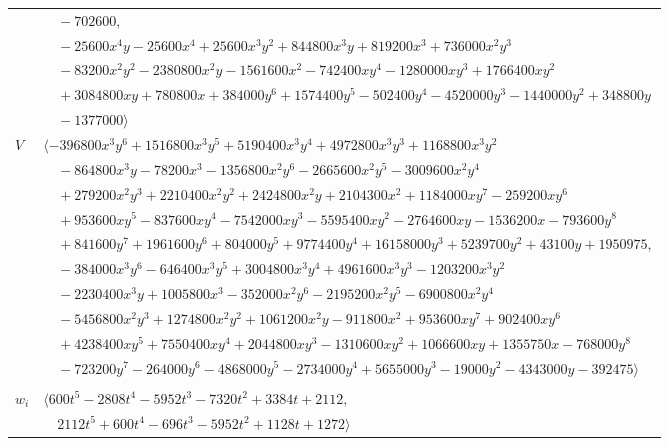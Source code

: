 \documentclass[11pt]{article}
\begin{document}
\begin{longtable}{@{}ll@{}}
 & $\quad -702600,$\\
 & $\quad -25600x^{4}y-25600x^{4}+25600x^{3}y^{2}+844800x^{3}y+819200x^{3}+736000x^{2}y^{3}$\\
 & $\quad -83200x^{2}y^{2}-2380800x^{2}y-1561600x^{2}-742400xy^{4}-1280000xy^{3}+1766400xy^{2}$\\
 & $\quad +3084800xy+780800x+384000y^{6}+1574400y^{5}-502400y^{4}-4520000y^{3}-1440000y^{2}+348800y$\\
 & $\quad -1377000\rangle$\\
$V$ & $\langle -396800x^{3}y^{6}+1516800x^{3}y^{5}+5190400x^{3}y^{4}+4972800x^{3}y^{3}+1168800x^{3}y^{2}$\\
 & $\quad -864800x^{3}y-78200x^{3}-1356800x^{2}y^{6}-2665600x^{2}y^{5}-3009600x^{2}y^{4}$\\
 & $\quad +279200x^{2}y^{3}+2210400x^{2}y^{2}+2424800x^{2}y+2104300x^{2}+1184000xy^{7}-259200xy^{6}$\\
 & $\quad +953600xy^{5}-837600xy^{4}-7542000xy^{3}-5595400xy^{2}-2764600xy-1536200x-793600y^{8}$\\
 & $\quad +841600y^{7}+1961600y^{6}+804000y^{5}+9774400y^{4}+16158000y^{3}+5239700y^{2}+43100y+1950975,$\\
 & $\quad -384000x^{3}y^{6}-646400x^{3}y^{5}+3004800x^{3}y^{4}+4961600x^{3}y^{3}-1203200x^{3}y^{2}$\\
 & $\quad -2230400x^{3}y+1005800x^{3}-352000x^{2}y^{6}-2195200x^{2}y^{5}-6900800x^{2}y^{4}$\\
 & $\quad -5456800x^{2}y^{3}+1274800x^{2}y^{2}+1061200x^{2}y-911800x^{2}+953600xy^{7}+902400xy^{6}$\\
 & $\quad +4238400xy^{5}+7550400xy^{4}+2044800xy^{3}-1310600xy^{2}+1066600xy+1355750x-768000y^{8}$\\
 & $\quad -723200y^{7}-264000y^{6}-4868000y^{5}-2734000y^{4}+5655000y^{3}-19000y^{2}-4343000y-392475\rangle$\\
\addlinespace[2pt]
\multicolumn{2}{@{}p{0.97\textwidth}@{}}{$i=71$, $D_i=8$, $\rho_{ij}$: $0{:}2, \allowbreak 8{:}1, \allowbreak 10{:}1, \allowbreak 11{:}1, \allowbreak 20{:}2, \allowbreak 22{:}1, \allowbreak 23{:}2, \allowbreak 25{:}2, \allowbreak 27{:}2, \allowbreak 32{:}2, \allowbreak 46{:}2, \allowbreak 49{:}1, \allowbreak 53{:}1, \allowbreak 55{:}2, \allowbreak 59{:}1, \allowbreak 60{:}2$}\\
$w_i$ & $\langle 600t^{5}-2808t^{4}-5952t^{3}-7320t^{2}+3384t+2112,$\\
 & $\quad 2112t^{5}+600t^{4}-696t^{3}-5952t^{2}+1128t+1272\rangle$\\

\end{longtable}
\end{document}
